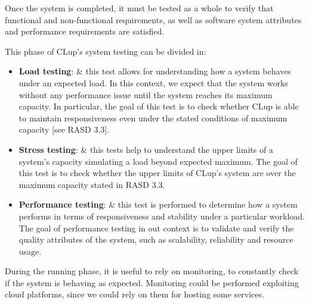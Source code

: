 \documentclass[../../main.tex]{subfiles}
\begin{document}
Once the system is completed, it must be tested as a whole to verify that functional and non-functional requirements, as well as software system attributes and performance requirements are satisfied.

This phase of CLup's system testing can be divided in:


\begin{itemize}

	\item \textbf{Load testing}: & this test allows for understanding how a system behaves under an expected load. 
	In this context, we expect that the system works without any performance issue until the system reaches its maximum capacity. 
	In particular, the goal of this test is to check whether CLup is able to maintain responsiveness even under the stated conditions of maximum capacity [see RASD 3.3].

	\item \textbf{Stress testing}: & this tests help to understand the upper limits of a system's capacity simulating a load beyond expected maximum. 
	The goal of this test is to check whether the upper limits of CLup's system are over the maximum capacity stated in RASD 3.3.

	\item \textbf{Performance testing}: & this test is performed to determine how a system performs in terms of responsiveness and stability under a particular workload. 
	The goal of performance testing in out context is to validate and verify the quality attributes of the system, such as scalability, reliability and resource usage.
	

\end{itemize} 

During the running phase, it is useful to rely on monitoring, to constantly check if the system is behaving as expected. 
Monitoring could be performed exploiting cloud platforms, since we could rely on them for hosting some services.

\end{document}

